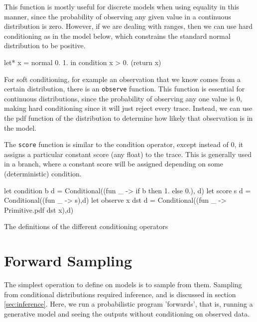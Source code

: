 This function is mostly useful for discrete models when using equality in this manner, since the probability of observing any given value in a continuous distribution is zero. However, if we are dealing with ranges, then we can use hard conditioning as in the model below, which constrains the standard normal distribution to be positive.

\begin{ocamlcode-in}
	let* x = normal 0. 1. in
	condition x > 0.
		(return x)		
\end{ocamlcode-in}

For soft conditioning, for example an observation that we know comes from a certain distribution, there is an \texttt{observe} function. This function is essential for continuous distributions, since the probability of observing any one value is 0, making hard conditioning since it will just reject every trace. Instead, we can use the pdf function of the distribution to determine how likely that observation is in the model.

The \texttt{score} function is similar to the condition operator, except instead of 0, it assigns a particular constant score (any float) to the trace. This is generally used in a branch, where a constant score will be assigned depending on some (deterministic) condition.
	
\begin{listing}[!htb]
	\centering
	\begin{ocamlcode-in}
let condition b d = Conditional((fun _ -> if b then 1. else 0.), d)
let score s d = Conditional((fun _ -> s),d)
let observe x dst d = Conditional((fun _ -> Primitive.pdf dst x),d) 
	\end{ocamlcode-in}	
	\caption{The definitions of the different conditioning operators}
	\label{lst:cond}
\end{listing}
	
\section{Forward Sampling}
The simplest operation to define on models is to sample from them. Sampling from conditional distributions required inference, and is discussed in section \ref{sec:inference}. Here, we run a probabilistic program 'forwards', that is, running a generative model and seeing the outputs without conditioning on observed data.
		
